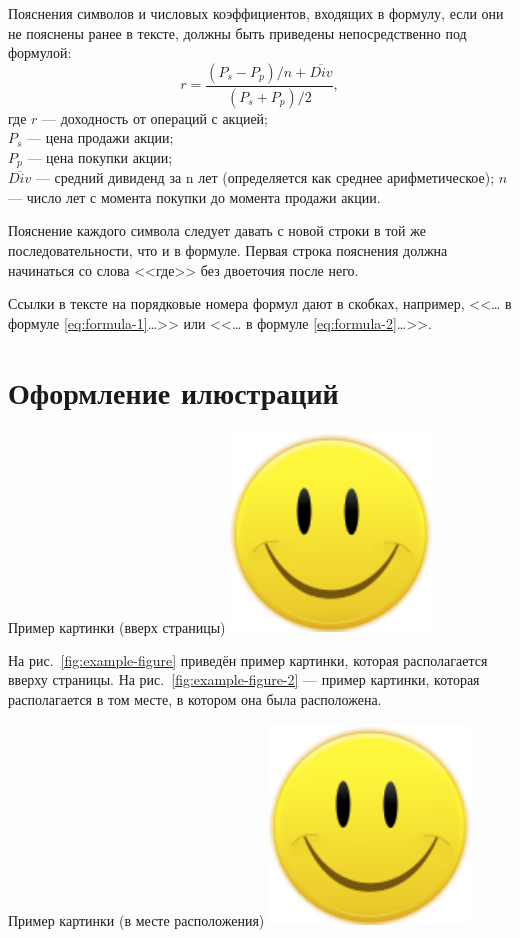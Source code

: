\documentclass[PI,VKR]{HSEUniversity}
\begin{document}
Пояснения символов и числовых коэффициентов, входящих в формулу, если они не пояснены ранее в тексте, должны быть приведены непосредственно под формулой:
\begin{equation}
	r = \frac{(P_s-P_p)/n + \overline{Div}}{(P_s + P_p)/2},
	\label{eq:formula-2}
\end{equation}
где $r$ --- доходность от операций с акцией;\\
$P_s$ --- цена продажи акции;\\
$P_p$ --- цена покупки акции;\\
$\overline{Div}$ --- средний дивиденд за n лет (определяется как среднее арифметическое); 
$n$ --- число лет с момента покупки до момента продажи акции.

Пояснение каждого символа следует давать с новой строки в той же последовательности, что и в формуле. Первая строка пояснения должна начинаться со слова <<где>> без двоеточия после него.

Ссылки в тексте на порядковые номера формул дают в скобках, например, <<\dots{} в формуле \eqref{eq:formula-1}\dots>> или <<\dots{} в формуле \eqref{eq:formula-2}\dots>>.

\section{Оформление илюстраций}

\begin{FIGURE}[t]{Пример картинки (вверх страницы)\label{fig:example-figure}}
	\includegraphics[width=0.4\textwidth]{img/fig}
\end{FIGURE}

На рис.~\ref{fig:example-figure} приведён пример картинки, которая располагается вверху страницы. На рис.~\ref{fig:example-figure-2} --- пример картинки, которая располагается в том месте, в котором она была расположена.

\begin{FIGURE}[h]{Пример картинки (в месте расположения) \label{fig:example-figure-2}}
	\includegraphics[width=0.4\textwidth]{img/fig}
\end{FIGURE}
\end{document}
